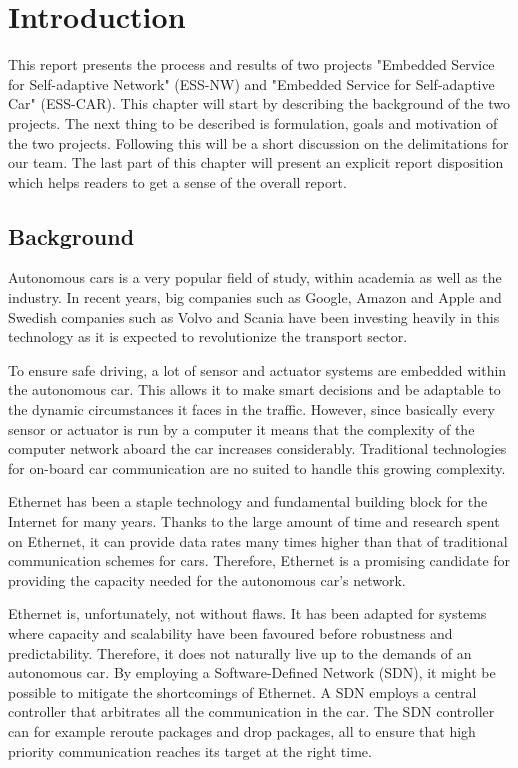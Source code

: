 \documentclass[11pt, titlepage]{article} %
\begin{document}
\clearpage
\section{Introduction}
This report presents the process and results of two projects "Embedded Service for Self-adaptive Network" (ESS-NW) and "Embedded Service for Self-adaptive Car" (ESS-CAR). This chapter will start by describing the background of the two projects. The next thing to be described is formulation, goals and motivation of the two projects. Following this will be a short discussion on the delimitations for our team. The last part of this chapter will present an explicit report disposition which helps readers to get a sense of the overall report.

\subsection{Background}
Autonomous cars is a very popular field of study, within academia as well as the industry.
In recent years, big companies such as Google, Amazon and Apple and Swedish companies such
as Volvo and Scania have been investing heavily in this technology as it is expected to
revolutionize the transport sector.

To ensure safe driving, a lot of sensor and actuator systems are embedded within the autonomous
car. This allows it to make smart decisions and be adaptable to the dynamic circumstances it
faces in the traffic. However, since basically every sensor or actuator is run by a computer it
means that the complexity of the computer network aboard the car increases considerably.
Traditional technologies for on-board car communication are no suited to handle this
growing complexity.

Ethernet has been a staple technology and fundamental building block for the Internet for
many years. Thanks to the large amount of time and research spent on Ethernet, it can
provide data rates many times higher than that of traditional communication schemes for
cars. Therefore, Ethernet is a promising candidate for providing the capacity needed for
the autonomous car's network.

Ethernet is, unfortunately, not without flaws. It has been adapted for systems where
capacity and scalability have been favoured before robustness and predictability. Therefore,
it does not naturally live up to the demands of an autonomous car. By employing a
Software-Defined Network (SDN), it might be possible to mitigate the shortcomings of Ethernet.
A SDN employs a central controller that arbitrates all the communication in the car. The
SDN controller can for example reroute packages and drop packages, all to ensure that
high priority communication reaches its target at the right time.
\end{document}
